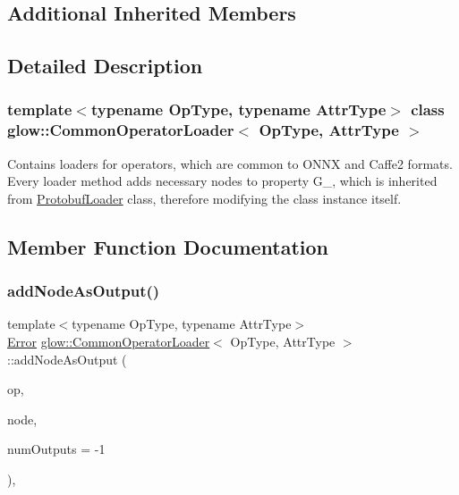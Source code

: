 \subsection*{Additional Inherited Members}


\subsection{Detailed Description}
\subsubsection*{template$<$typename Op\+Type, typename Attr\+Type$>$\newline
class glow\+::\+Common\+Operator\+Loader$<$ Op\+Type, Attr\+Type $>$}

Contains loaders for operators, which are common to O\+N\+NX and Caffe2 formats. Every loader method adds necessary nodes to property G\+\_\+, which is inherited from \hyperlink{classglow_1_1_protobuf_loader}{Protobuf\+Loader} class, therefore modifying the class instance itself. 

\subsection{Member Function Documentation}
\mbox{\label{classglow_1_1_common_operator_loader_ab759aea69c4a85d95d1fbd6ed068618b}} 
\subsubsection{\texorpdfstring{add\+Node\+As\+Output()}{addNodeAsOutput()}}
{\footnotesize\ttfamily template$<$typename Op\+Type, typename Attr\+Type$>$ \\
\hyperlink{namespaceglow_afdb176c3a672ef66db0ecfc19a8d39bf}{Error} \hyperlink{classglow_1_1_common_operator_loader}{glow\+::\+Common\+Operator\+Loader}$<$ Op\+Type, Attr\+Type $>$\+::add\+Node\+As\+Output (\begin{DoxyParamCaption}\item[{const Op\+Type \&}]{op,  }\item[{\hyperlink{classglow_1_1_node}{Node} $\ast$}]{node,  }\item[{int}]{num\+Outputs = {\ttfamily -\/1} }\end{DoxyParamCaption})\hspace{0.3cm}{\ttfamily [inline]}, {\ttfamily [protected]}}

